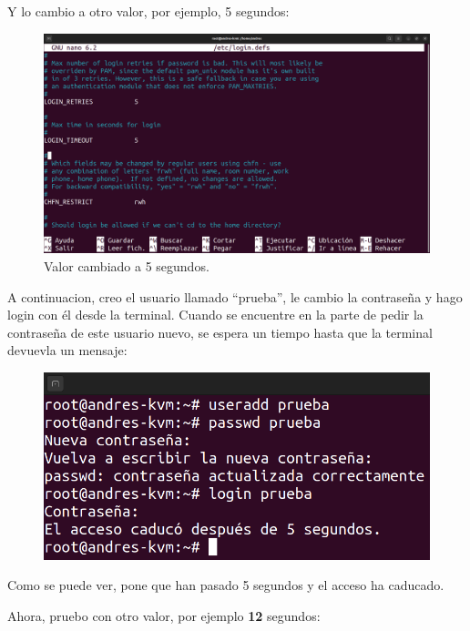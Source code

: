 \documentclass{article}
\begin{document}
Y lo cambio a otro valor, por ejemplo, 5 segundos:

\begin{figure}[H]
    \includegraphics[width=\textwidth]{imagenes/tout5.png}
    \caption{Valor cambiado a 5 segundos.}
\end{figure}

A continuacion, creo el usuario llamado ``prueba'', le cambio la contraseña y hago login con él desde la terminal. Cuando se encuentre en la parte de pedir la contraseña de este usuario nuevo, se espera un tiempo hasta que la terminal devuevla un mensaje:

\begin{figure}[H]
    \includegraphics[width=\textwidth]{imagenes/tout5login.png}
\end{figure}

Como se puede ver, pone que han pasado 5 segundos y el acceso ha caducado.

Ahora, pruebo con otro valor, por ejemplo \textbf{12} segundos:
\end{document}
